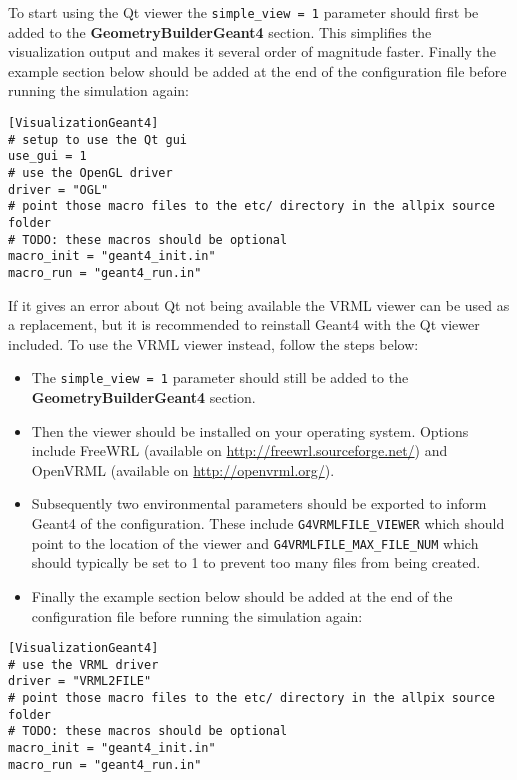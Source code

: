 To start using the Qt viewer the \texttt{simple\_view = 1} parameter should first be added to the \textbf{GeometryBuilderGeant4} section. This simplifies the visualization output and makes it several order of magnitude faster. Finally the example section below should be added at the end of the configuration file before running the simulation again:
\begin{verbatim}
[VisualizationGeant4]
# setup to use the Qt gui
use_gui = 1
# use the OpenGL driver
driver = "OGL" 
# point those macro files to the etc/ directory in the allpix source folder
# TODO: these macros should be optional
macro_init = "geant4_init.in"
macro_run = "geant4_run.in"
\end{verbatim}
If it gives an error about Qt not being available the VRML viewer can be used as a replacement, but it is recommended to reinstall Geant4 with the Qt viewer included. To use the VRML viewer instead, follow the steps below:
\begin{itemize}
\item The \texttt{simple\_view = 1} parameter should still be added to the \textbf{GeometryBuilderGeant4} section.
\item Then the viewer should be installed on your operating system. Options include FreeWRL (available on \url{http://freewrl.sourceforge.net/}) and OpenVRML (available on \url{http://openvrml.org/}).
\item Subsequently two environmental parameters should be exported to inform Geant4 of the configuration. These include \texttt{G4VRMLFILE\_VIEWER} which should point to the location of the viewer and \texttt{G4VRMLFILE\_MAX\_FILE\_NUM} which should typically be set to 1 to prevent too many files from being created.
\item Finally the example section below should be added at the end of the configuration file before running the simulation again:
\end{itemize}

\begin{verbatim}
[VisualizationGeant4]
# use the VRML driver
driver = "VRML2FILE" 
# point those macro files to the etc/ directory in the allpix source folder
# TODO: these macros should be optional
macro_init = "geant4_init.in"
macro_run = "geant4_run.in"
\end{verbatim}


